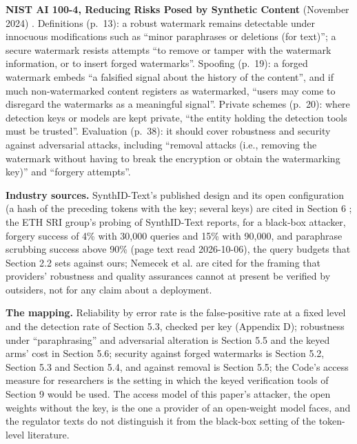 \documentclass[11pt,letterpaper]{article}
\begin{document}
\textbf{NIST AI 100-4, Reducing Risks Posed by Synthetic Content} (November 2024) \citep{nist2024ai1004}. Definitions (p.~13): a robust watermark remains detectable under innocuous modifications such as ``minor paraphrases or deletions (for text)''; a secure watermark resists attempts ``to remove or tamper with the watermark information, or to insert forged watermarks''. Spoofing (p.~19): a forged watermark embeds ``a falsified signal about the history of the content'', and if much non-watermarked content registers as watermarked, ``users may come to disregard the watermarks as a meaningful signal''. Private schemes (p.~20): where detection keys or models are kept private, ``the entity holding the detection tools must be trusted''. Evaluation (p.~38): it should cover robustness and security against adversarial attacks, including ``removal attacks (i.e., removing the watermark without having to break the encryption or obtain the watermarking key)'' and ``forgery attempts''.

\textbf{Industry sources.} SynthID-Text's published design and its open configuration (a hash of the preceding tokens with the key; several keys) are cited in Section 6 \citep{dathathri2024synthid, huggingface2026synthidconfig}; the ETH SRI group's probing of SynthID-Text \citep{jovanovic2024probingsynthid} reports, for a black-box attacker, forgery success of 4\% with 30,000 queries and 15\% with 90,000, and paraphrase scrubbing success above 90\% (page text read 2026-10-06), the query budgets that Section 2.2 sets against ours; Nemecek et al. \citep{nemecek2026verification} are cited for the framing that providers' robustness and quality assurances cannot at present be verified by outsiders, not for any claim about a deployment.

\textbf{The mapping.} Reliability by error rate is the false-positive rate at a fixed level and the detection rate of Section 5.3, checked per key (Appendix D); robustness under ``paraphrasing'' and adversarial alteration is Section 5.5 and the keyed arms' cost in Section 5.6; security against forged watermarks is Section 5.2, Section 5.3 and Section 5.4, and against removal is Section 5.5; the Code's access measure for researchers is the setting in which the keyed verification tools of Section 9 would be used. The access model of this paper's attacker, the open weights without the key, is the one a provider of an open-weight model faces, and the regulator texts do not distinguish it from the black-box setting of the token-level literature.
\end{document}

